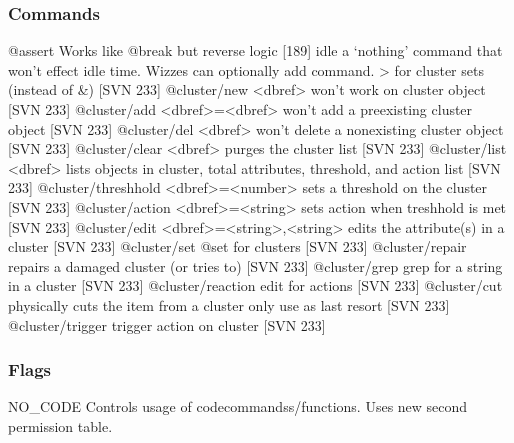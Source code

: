 \documentclass[letterpaper,10pt,english]{sphinxmanual}
\begin{document}
\subsubsection{Commands}
\label{\detokenize{changelog:commands}}
\sphinxAtStartPar
@assert \sphinxhyphen{} Works like @break but reverse logic {[}18\sphinxhyphen{}9{]}
idle \sphinxhyphen{} a ‘nothing’ command that won’t effect idle time.  Wizzes can optionally add command.
\textgreater{} for cluster sets (instead of \&) {[}SVN 233{]}
@cluster/new \textless{}dbref\textgreater{}                    \textendash{} won’t work on cluster object {[}SVN 233{]}
@cluster/add \textless{}dbref\textgreater{}=\textless{}dbref\textgreater{}            \textendash{} won’t add a pre\sphinxhyphen{}existing cluster object {[}SVN 233{]}
@cluster/del \textless{}dbref\textgreater{}                    \textendash{} won’t delete a non\sphinxhyphen{}existing cluster object {[}SVN 233{]}
@cluster/clear \textless{}dbref\textgreater{}                  \textendash{} purges the cluster list {[}SVN 233{]}
@cluster/list \textless{}dbref\textgreater{}                   \textendash{} lists objects in cluster, total attributes, threshold, and action list {[}SVN 233{]}
@cluster/threshhold \textless{}dbref\textgreater{}=\textless{}number\textgreater{}    \textendash{} sets a threshold on the cluster {[}SVN 233{]}
@cluster/action \textless{}dbref\textgreater{}=\textless{}string\textgreater{}        \textendash{} sets action when treshhold is met {[}SVN 233{]}
@cluster/edit \textless{}dbref\textgreater{}=\textless{}string\textgreater{},\textless{}string\textgreater{} \textendash{} edits the attribute(s) in a cluster {[}SVN 233{]}
@cluster/set                            \textendash{} @set for clusters {[}SVN 233{]}
@cluster/repair                         \textendash{} repairs a damaged cluster (or tries to) {[}SVN 233{]}
@cluster/grep                           \textendash{} grep for a string in a cluster {[}SVN 233{]}
@cluster/reaction                       \textendash{} edit for actions {[}SVN 233{]}
@cluster/cut                            \textendash{} physically cuts the item from a cluster \sphinxhyphen{} only use as last resort {[}SVN 233{]}
@cluster/trigger                        \textendash{} trigger action on cluster {[}SVN 233{]}


\subsubsection{Flags}
\label{\detokenize{changelog:flags}}
\sphinxAtStartPar
NO\_CODE  \sphinxhyphen{} Controls usage of code\sphinxhyphen{}commandss/functions.  Uses new second permission table.
\end{document}
